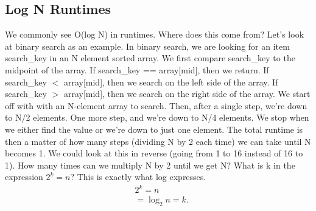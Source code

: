 \documentclass{report}
\begin{document}
    \subsection{Log N Runtimes}
    \bigbreak \noindent 
    We commonly see O(log N) in runtimes. Where does this come from?
    \bigbreak \noindent 
    Let’s look at binary search as an example. In binary search, we are looking for an item search\_key in an N element sorted array. We first compare search\_key to the midpoint of the array. If search\_key == array[mid], then we return. If search\_key $<$ array[mid], then we search on the left side of the array. If search\_key $>$ array[mid], then we search on the right side of the array.
    \bigbreak \noindent 
    We start off with with an N-element array to search. Then, after a single step, we’re down to N/2 elements. One more step, and we’re down to N/4 elements. We stop when we either find the value
    \bigbreak \noindent 
    or we’re down to just one element. The total runtime is then a matter of how many steps (dividing N by 2 each time) we can take until N becomes 1.
    \bigbreak \noindent 
    We could look at this in reverse (going from 1 to 16 instead of 16 to 1). How many times can we multiply N by 2 until we get N?
    \bigbreak \noindent 
    What is k in the expression $2^{k} = n$? This is exactly what log expresses.
    \begin{align*}
        &2^{k} = n \\
        &=\log_{2}{n} = k
    .\end{align*}

    \bigbreak \noindent 
\end{document}
